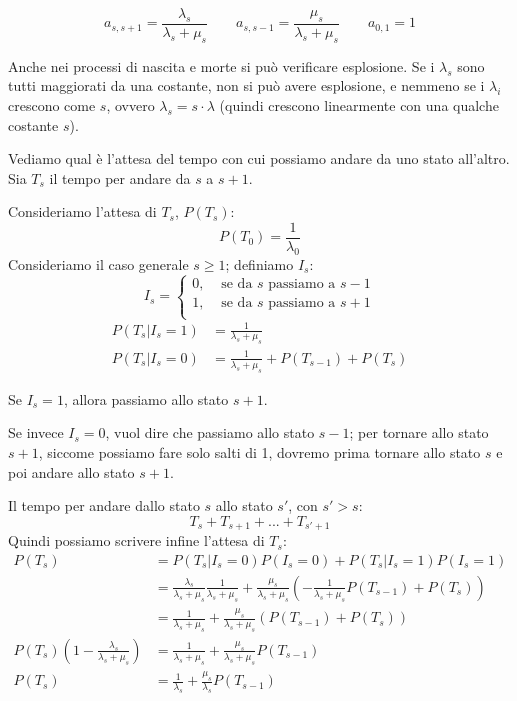 \documentclass[a4paper,12pt]{book}
\begin{document}
$$ a_{s,s+1} = \frac{\lambda_s}{\lambda_s + \mu_s} \qquad a_{s,s-1} = \frac{\mu_s}{\lambda_s + \mu_s} \qquad a_{0,1} = 1$$

Anche nei processi di nascita e morte si può verificare esplosione. Se i $\lambda_s$ sono tutti maggiorati da una costante, non si può avere esplosione, e nemmeno se i $\lambda_i$ crescono come $ s $, ovvero $\lambda_s = s \cdot \lambda$ (quindi crescono linearmente con una qualche costante $ s $). %

Vediamo qual è l'attesa del tempo con cui possiamo andare da uno stato all'altro. Sia $ T_s $ il tempo per andare da $ s $ a $ s+1 $. 

Consideriamo l'attesa di $ T_s $, $ P(T_s) $:
$$ P(T_0) = \frac{1}{\lambda_0}$$
Consideriamo il caso generale $ s \ge 1 $; definiamo $ I_s $:
$$ I_s = \begin{cases}
	0, & \text{ se da } s \text{ passiamo a } s-1 \\
	1, & \text{ se da } s \text{ passiamo a } s+1 \\
\end{cases}$$
\begin{align*}
	P(T_s | I_s = 1) & = \frac{1}{\lambda_s + \mu_s} \\
	P(T_s | I_s = 0) & = \frac{1}{\lambda_s + \mu_s} + P(T_{s-1}) + P(T_s) 
\end{align*}

Se $ I_s = 1 $, allora passiamo allo stato $ s+1 $.

Se invece $ I_s = 0$, vuol dire che passiamo allo stato $ s-1 $; per tornare allo stato $ s+1 $, siccome possiamo fare solo salti di 1, dovremo prima tornare allo stato $ s $ e poi andare allo stato $ s+1 $.

Il tempo per andare dallo stato $ s $ allo stato $ s' $, con $ s' > s $:
$$ T_s + T_{s+1} + ... + T_{s'+1} $$
Quindi possiamo scrivere infine l'attesa di $ T_s $:
\begin{align*}
	P(T_s) & = P(T_s | I_s = 0)P(I_s = 0) + P(T_s | I_s = 1)P(I_s = 1) \\
	& = \frac{\lambda_s}{\lambda_s + \mu_s}\frac{1}{\lambda_s + \mu_s} + \frac{\mu_s}{\lambda_s + \mu_s} \left( - \frac{1}{\lambda_s + \mu_s} P(T_{s-1}) + P(T_s) \right) \\
	& = \frac{1}{\lambda_s + \mu_s} + \frac{\mu_s}{\lambda_s + \mu_s}\left(P(T_{s-1}) + P(T_s) \right) \\
	P(T_s)\left(1 - \frac{\lambda_s}{\lambda_s + \mu_s} \right) & = \frac{1}{\lambda_s + \mu_s} + \frac{\mu_s}{\lambda_s + \mu_s} P(T_{s-1}) \\
	P(T_s) & = \frac{1}{\lambda_s} + \frac{\mu_s}{\lambda_s} P(T_{s-1})
\end{align*}
\end{document}
